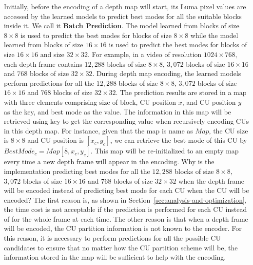 Initially, before the encoding of a depth map will start, 
its Luma pixel values are accessed by the learned models to
predict best modes for all the suitable blocks inside it.
We call it \textbf{Batch Prediction}.
The model learned from blocks of size \(8\times8\) is used 
to predict the best modes for blocks of size \(8\times8\)
while the model learned from blocks of size \(16\times16\)
is used to predict the best modes for blocks of 
size \(16\times16\) and size \(32\times32\).
For example, in a video of resolution 
\(1024\times768\), each depth frame contains \(12,288\)
blocks of size \(8\times8\), \(3,072\) blocks of
size \(16\times16\) and \(768\) blocks of size 
\(32\times32\).
During depth map encoding, the learned models perform
predictions for all the \(12,288\)
blocks of size \(8\times8\), \(3,072\) blocks of
size \(16\times16\) and \(768\) blocks of size 
\(32\times32\).
The prediction results are stored in a map with 
three elements comprising size of block, CU position \(x\),
and CU position \(y\) as the key, 
and best mode as the value.
The information in this map will be retrieved 
using key to get the corresponding value
when recursively encoding CUs in 
this depth map.
For instance, given that the map is name as \(Map\),
the CU size is \(8\times8\) and CU position is \([x_c, y_c]\),
we can retrieve the best mode of this 
CU by \(BestMode_c = Map[8, x_c, y_c]\).
This map will be re-initialized to an empty map
every time a new depth frame will appear in the encoding.
Why is the implementation predicting best modes for all 
the \(12,288\) blocks of size \(8\times8\), 
\(3,072\) blocks of size \(16\times16\) and 
\(768\) blocks of size \(32\times32\)
when the depth frame will be encoded instead
of predicting best mode for
each CU when the CU will be encoded?
The first reason is, as shown in Section~\ref{sec:analysis-and-optimization},
the time cost is not acceptable if the prediction
is performed for each CU instead of for the whole
frame at each time.
The other reason is that when a depth frame will be
encoded, the CU partition information is 
not known to the encoder.
For this reason, it is necessary to perform 
predictions for all the possible CU candidates
to ensure that no matter how the CU partition scheme
will be, the information stored in the map
will be sufficient to help with the encoding.

